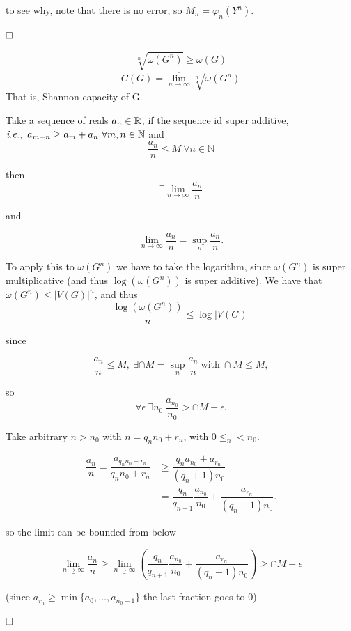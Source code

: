 to see why, note that there is no error, so $M_n = \varphi_n(Y^n).$

$\hfill\Box$

\[
 \sqrt[n]{\omega(G^n)} \geq \omega(G)
\]
\[
 C(G) = \overline{\lim_{n\rightarrow \infty}}\sqrt[n]{\omega(G^n)}
\]
That is, Shannon capacity of G.

\begin{lem}[Fevete]
Take a sequence of reals $a_n \in \mathbb{R}$, if the sequence id super additive, $\textit{i.e.},\ a_{m+n} \geq a_m + a_n\ \forall m, n \in \mathbb{N}$ and
\[
 \dfrac{a_n}{n} \leq M\ \forall n \in \mathbb{N}
\]

then
\[
 \exists \lim_{n \rightarrow \infty}  \dfrac{a_n}{n} 
\]

and

\[
\lim_{n \rightarrow \infty}  \dfrac{a_n}{n} = \sup_n \dfrac{a_n}{n}. 
\]
 
\end{lem}

To apply this to $\omega(G^n)$ we have to take the logarithm, since $\omega(G^n)$ is super multiplicative (and thus $\log(\omega(G^n))$ is super additive). We have that $\omega(G^n) \leq |V(G)|^n$, and thus
\[
 \dfrac{\log(\omega(G^n))}{n} \leq \log|V(G)|
\]

since 

\[
 \dfrac{a_n}{n} \leq M,\ \exists \cap{M} = \sup_n \dfrac{a_n}{n}\ \text{with}\ \cap{M} \leq M,
\]

so
\[
 \forall \epsilon\ \exists n_0\ \dfrac{a_{n_0}}{n_0} > \cap{M} - \epsilon.  
\]

Take arbitrary $n > n_0$ with $n = q_nn_0 +r_n$, with $0 \leq _n < n_0$.

\begin{align*}
 \dfrac{a_n}{n} = \dfrac{a_{q_nn_0 +r_n}}{q_nn_0 +r_n} & \geq \dfrac{q_na_{n_0} +a_{r_n}}{(q_n+1)n_0}\\
 & = \dfrac{q_n}{q_{n+1}} \dfrac{a_{n_0}}{n_0} + \dfrac{a_{r_n}}{(q_n + 1)n_0}.
\end{align*}

so the limit can be bounded from below

\[
 \underline{\lim_{n\rightarrow \infty}} \dfrac{a_n}{n} \geq \underline{\lim_{n\rightarrow \infty}}\left(\dfrac{q_n}{q_{n+1}} \dfrac{a_{n_0}}{n_0} + \dfrac{a_{r_n}}{(q_n + 1)n_0}\right) \geq \cap{M} - \epsilon
\]

(since $a_{r_n} \geq \min\{a_0, \ldots,a_{n_0 -1}\}$ the last fraction goes to 0).

$\hfill\Box$

